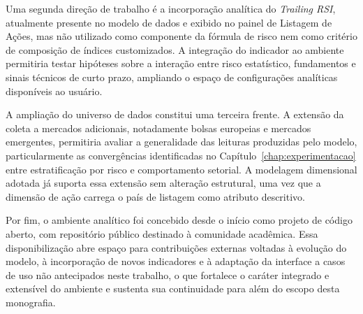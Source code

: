 Uma segunda direção de trabalho é a incorporação analítica do \textit{Trailing RSI}, atualmente presente no modelo de dados e exibido no painel de Listagem de Ações, mas não utilizado como componente da fórmula de risco nem como critério de composição de índices customizados. A integração do indicador ao ambiente permitiria testar hipóteses sobre a interação entre risco estatístico, fundamentos e sinais técnicos de curto prazo, ampliando o espaço de configurações analíticas disponíveis ao usuário.

A ampliação do universo de dados constitui uma terceira frente. A extensão da coleta a mercados adicionais, notadamente bolsas europeias e mercados emergentes, permitiria avaliar a generalidade das leituras produzidas pelo modelo, particularmente as convergências identificadas no Capítulo~\ref{chap:experimentacao} entre estratificação por risco e comportamento setorial. A modelagem dimensional adotada já suporta essa extensão sem alteração estrutural, uma vez que a dimensão de ação carrega o país de listagem como atributo descritivo.

Por fim, o ambiente analítico foi concebido desde o início como projeto de código aberto, com repositório público destinado à comunidade acadêmica. Essa disponibilização abre espaço para contribuições externas voltadas à evolução do modelo, à incorporação de novos indicadores e à adaptação da interface a casos de uso não antecipados neste trabalho, o que fortalece o caráter integrado e extensível do ambiente e sustenta sua continuidade para além do escopo desta monografia.